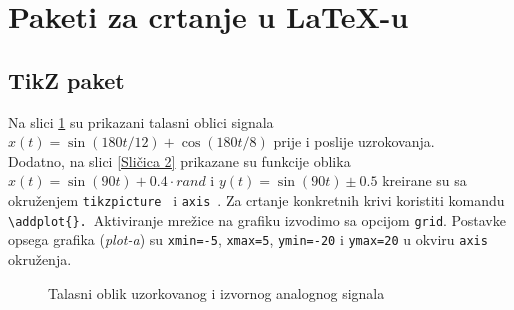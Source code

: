 \documentclass{article}
\newcommand{\plavo}[1]
{\texttt{\color{blue}#1\color{black}}~}
\newcommand{\crveno}[2]
{\texttt{\color{red}#1\color{black}}~}
\begin{document}
\section{Paketi za crtanje u \LaTeX{}-u}
\subsection{TikZ paket}
Na slici \ref{Sličica 1} su prikazani talasni oblici signala $x(t) = \sin(180t/12) + \cos(180t/8)$ prije i poslije uzrokovanja. \\ Dodatno, na slici \ref{Sličica 2} prikazane su funkcije oblika $x(t) = \sin(90t)+ 0.4\cdot rand $ i $y(t) = \sin(90t)\pm0.5$ kreirane su sa okruženjem {\plavo{tikzpicture}} i {\plavo{axis}}. Za crtanje konkretnih krivi koristiti komandu \crveno{\textbackslash{}{addplot\color{black}\{\}.}}\{Aktiviranje mrežice na grafiku izvodimo sa opcijom \texttt{grid}. Postavke opsega grafika (\textit{plot-a}) su \texttt{xmin=-5}, \texttt{xmax=5}, \texttt{ymin=-20} i \texttt{ymax=20} u okviru {\plavo{axis}} okruženja.


\newpage
\begin{figure}[!htb]
\centering

    \caption{Talasni oblik uzorkovanog i izvornog analognog signala}
    \label{Sličica 1}
    
\end{figure}
\end{document}
